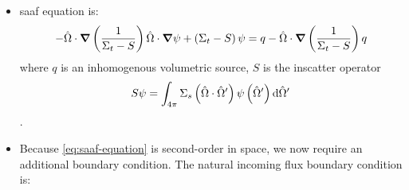 \begin{itemize}
\begin{itemize}
              \item The matrix produced in a region that is purely scattering is singular.
          \end{itemize}
          Advantages of the \gls{saaf} equation \textit{in addition to those listed above for the even- and odd-parity equations}:
          \begin{itemize}
              \item Angular flux is directly solved for (rather than needing to reconstruct from the parity solutions).
              \item Reflective and reflective-like boundary conditions are coupled the same way as they are in the standard first-order transport equation, and thus are much simpler to implement with \Sn.
              \item Can be solved in a void.
          \end{itemize}
          Disadvantages of the \gls{saaf} equation (independent of the above):
          \begin{itemize}
              \item Cannot be swept for source iterations (for the same reason as above).
              \item Cannot be solved in a purely-scattering region (for the same reason as above).
              \item Angular domain is the full unit sphere (as opposed to only a half of the unit sphere in the even- and odd-parity equations).
          \end{itemize}
    \item \Gls{saaf} equation is:
          \begin{equation}\label{eq:saaf-equation}
              -\hat{\Omega}\cdot \grad \left(\frac{1}{\Sigma_t-S}\right)\hat{\Omega}\cdot \grad \psi+\left(\Sigma_t-S\right)\psi = q-\hat{\Omega}\cdot \grad \left(\frac{1}{\Sigma_t-S}\right)q
          \end{equation}
          where $q$ is an inhomogenous volumetric source, $S$ is the inscatter operator \begin{equation} \label{eq:scatter-operator}
              S\psi=\int_{4\pi}\Sigma_s \left(\hat{\Omega}\cdot\hat{\Omega} '\right)\psi\left(\hat{\Omega} '\right)\dd \hat{\Omega} '
          \end{equation}.
    \item Because \cref{eq:saaf-equation} is second-order in space, we now require an additional boundary condition. The natural incoming flux boundary condition is:
          \begin{equation*}

\end{equation*}
\end{itemize}
